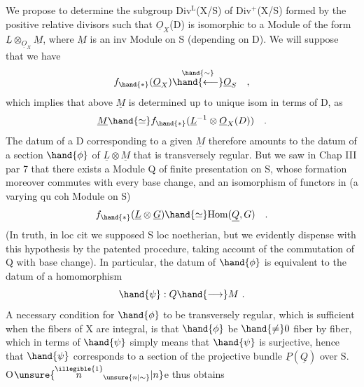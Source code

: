 
We propose to determine the subgroup Div$^{\mathrm{L}}$(X/S) of Div$^{+}$(X/S)
formed by the positive relative divisors such that $\underline{O}_X$(D) is isomorphic to
a Module of the form $\underline{L}\otimes_{\underline{O}_X}\underline{M}$, where $\underline{M}$ is an inv Module on S (depending on
D). We will suppose that we have
\[ f_{\hand{*}}(\underline{O}_X)\overset{\hand{\sim}}{\hand{\longleftarrow}}\underline{O}_S \quad , \]
which implies that above $\underline{M}$ is determined up to unique isom in terms
of D, as
\[ \underline{M}\hand{\simeq} f_{\hand{*}}(\underline{L}^{-1}\otimes\underline{O}_X(D)) \quad . \]
The datum of a D corresponding to a given $\underline{M}$ therefore amounts to the datum
of a section $\hand{\phi}$ of $\underline{L}\otimes\underline{M}$ that is transversely regular. But we saw in
Chap III par 7  that there  exists a Module Q of
finite presentation on S, whose formation moreover commutes with every
base change, and an isomorphism of functors in  (a varying qu coh
Module on S)
\[ f_{\hand{*}}(\underline{L}\otimes\underline{G})\hand{\simeq} \mathrm{Hom}(\underline{Q},G) \quad . \]
(In truth, in loc cit we supposed S loc noetherian, but we
evidently dispense with this hypothesis by the patented procedure,
taking account of the commutation of Q with base change). In particular,
the datum of $\hand{\phi}$ is equivalent to  the datum of a homomorphism
\[ \hand{\psi} : Q \hand{\longrightarrow} M \ . \]
A necessary condition for $\hand{\phi}$ to be transversely regular, which
is sufficient when the fibers of X are integral, is that $\hand{\phi}$ be
$\hand{\neq} 0$  fiber by fiber, which in terms of $\hand{\psi}$ simply means that
$\hand{\psi}$ is surjective, hence that  $\hand{\psi}$ corresponds to a section of the projective
bundle $\underline{P}(\underline{Q})$ over S. O$\unsure{\overset{\illegible{1}}{n}_{\unsure{n|\sim}}|n}$e thus obtains

